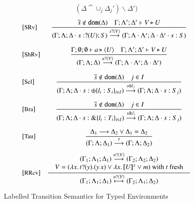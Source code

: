 \begin{figure}[t]
\[\begin{array}{l}
{			(\Delta \cat \cup_j \Delta_j') \backslash \Delta')
		}
\end{array}
\]
\[
\begin{array}{lc}
	\eltsrule{SRv}&\tree{
			\dual{s} \notin \dom{\Delta} \quad \Gamma; \Lambda'; \Delta' \proves V \hastype U
		}{
			(\Gamma; \Lambda; \Delta \cat s: \btinp{U} S) \by{\bactinp{s}{V}} (\Gamma; \Lambda\cat\Lambda'; \Delta\cat\Delta' \cat s: S)
		}
		\\[8mm]
		\eltsrule{ShRv}&\tree{
			\Gamma; \es; \es \proves a \hastype \chtype{U}
			\quad
			\Gamma; \Lambda'; \Delta' \proves V \hastype U
		}{
			(\Gamma; \Lambda; \Delta) \by{\bactinp{a}{{V}}} (\Gamma; \Lambda\cat\Lambda'; \Delta\cat\Delta')
		}
		\\[8mm]

		\eltsrule{Sel}&\tree{
			\dual{s} \notin \dom{\Delta} \quad j \in I
		}{
			(\Gamma; \Lambda; \Delta \cat s: \btsel{l_i: S_i}_{i \in I}) \by{\bactsel{s}{l_j}} (\Gamma; \Lambda; \Delta \cat s:S_j)
		}
\\[8mm]
		\eltsrule{Bra}&\tree{
			\dual{s} \notin \dom{\Delta} \quad j \in I
		}{
			(\Gamma; \Lambda; \Delta \cat s: \btbra{l_i: T_i}_{i \in I}) \by{\bactbra{s}{l_j}} (\Gamma; \Lambda; \Delta \cat s:S_j)
		}
		\\[8mm]
		\eltsrule{Tau}&\tree{
			\Delta_1 \red \Delta_2 \vee \Delta_1 = \Delta_2
		}{
			(\Gamma; \Lambda; \Delta_1) \by{\tau} (\Gamma; \Lambda; \Delta_2)
		}
\\[6mm]
		\eltsrule{RRcv}&\tree {
\begin{array}{c}
(\Gamma_1; \Lambda_1; \Delta_1) \by{\bactinp{n}{V}} (\Gamma_2; \Lambda_2; \Delta_2)
\\
			\begin{array}{lll}
				 V  =  
(\abs{{x}}{\binp{t}{y} (\appl{y}{{x}})}
 \vee  \abs{{x}}{\map{U}^{{x}}}  \vee m)  \textrm{ with } t \textrm{ fresh} 
			\end{array}
			\end{array}
		}{
			(\Gamma_1; \Lambda_1; \Delta_1) \hby{\bactinp{n}{V}} (\Gamma_2; \Lambda_1; \Delta_2)
		}
	\end{array}
	\]
	\caption{Labelled Transition Semantics for Typed Environments \label{fig:envLTS}}
\end{figure}

